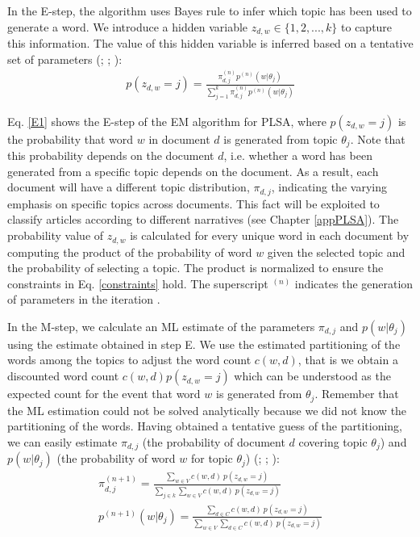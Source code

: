 \documentclass[11pt,a4paper,english,oneside]{book}
\numberwithin{equation}{chapter}
\begin{document}
In the E-step, the algorithm uses Bayes rule to infer which topic has been used to generate a word. We introduce a hidden variable $z_{d,w} \in \{1,2,...,k\}$ to capture this information. The value of this hidden variable is inferred based on a tentative set of parameters (\citealp[p. 290]{Hofmann.1999}; \citeyear[p. 182]{Hofmann.2001}; \citealp[pp. 362--374]{Zhai.2016}):
%
\begin{align}\label{E1}
p(z_{d,w}=j)=\frac{\pi_{d,j}^{(n)}p^{(n)}(w|\theta_j)}{\sum_{j=1}^{k}\pi_{d,j}^{(n)}p^{(n)}(w|\theta_j)}
\end{align}

Eq. \ref{E1} shows the E-step of the EM algorithm for PLSA, where $p(z_{d,w}=j)$ is the probability that word $w$ in document $d$ is generated from topic $\theta_j$. Note that this probability depends on the document $d$, i.e. whether a word has been generated from a specific topic depends on the document. As a result, each document will have a different topic distribution, $\pi_{d,j}$, indicating the varying emphasis on specific topics across documents. This fact will be exploited to classify articles according to different narratives (see Chapter \ref{appPLSA}). The probability value of $z_{d,w}$ is calculated for every unique word in each document by computing the product of the probability of word $w$ given the selected topic and the probability of selecting a topic. The product is normalized to ensure the constraints in Eq. \ref{constraints} hold. The superscript $^{(n)}$ indicates the generation of parameters in the iteration \citep[pp. 374--376]{Zhai.2016}.  

In the M-step, we calculate an ML estimate of the parameters $\pi_{d,j}$ and $p(w|\theta_j)$ using the estimate obtained in step E. We use the estimated partitioning of the words among the topics to adjust the word count $c(w,d)$, that is we obtain a discounted word count $c(w,d) p(z_{d,w}=j)$ which can be understood as the expected count for the event that word $w$ is generated from $\theta_j$. Remember that the ML estimation could not be solved analytically because we did not know the partitioning of the words. Having obtained a tentative guess of the partitioning, we can easily estimate $\pi_{d,j}$ (the probability of document $d$ covering topic $\theta_j$) and $p(w|\theta_j)$ (the probability of word $w$ for topic $\theta_j$) (\citealp[p. 290]{Hofmann.1999}; \citeyear[p. 182]{Hofmann.2001}; \citealp[pp. 364--375]{Zhai.2016}):
\begin{align}%
\label{M1pi} \pi_{d,j}^{(n+1)}=\frac{\sum_{w \in V} c(w,d)\ p(z_{d,w}=j)}{\sum_{j \in k}\sum_{w \in V}c(w,d) \ p(z_{d,w}=j)}\\
\label{M1theta} p^{(n+1)}(w|\theta_j)=\frac{\sum_{d \in C} c(w,d)\ p(z_{d,w}=j)}{\sum_{w \in V}\sum_{d \in C}c(w,d)\ p(z_{d,w}=j)}
\end{align}
\end{document}
